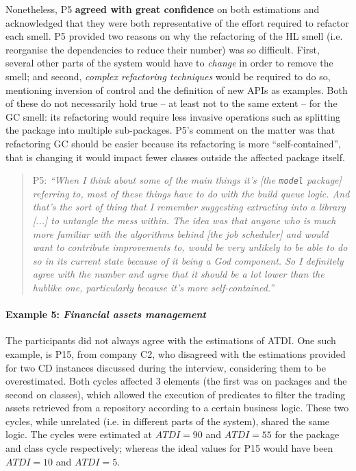 Nonetheless, P5 \textbf{agreed with great confidence} on both estimations and acknowledged that they were both representative of the effort required to refactor each smell.
P5 provided two reasons on why the refactoring of the HL smell (i.e. reorganise the dependencies to reduce their number) was so difficult.
First, several other parts of the system would have to \emph{change} in order to remove the smell;
and second, \emph{complex refactoring techniques} would be required to do so, mentioning inversion of control and the definition of new APIs as examples.
Both of these do not necessarily hold true -- at least not to the same extent -- for the GC smell: its refactoring would require less invasive operations such as splitting the package into multiple sub-packages.
P5's comment on the matter was that refactoring GC should be easier because its refactoring is more ``self-contained'', that is changing it would impact fewer classes outside the affected package itself.

\begin{quote}
    P5: \emph{``When I think about some of the main things it's [the \texttt{model} package] referring to, most of these things have to do with the build queue logic. And that's the sort of thing that I remember suggesting extracting into a library [...] to untangle the mess within. The idea was that anyone who is much more familiar with the algorithms behind [the job scheduler] and would want to contribute improvements to, would be very unlikely to be able to do so in its current state because of it being a God component. 
    So I definitely agree with the number and agree that it should be a lot lower than the hublike one, particularly because it's more self-contained.''}
\end{quote}

\paragraph{Example 5: \emph{Financial assets management}}
The participants did not always agree with the estimations of ATDI. One such example, is P15, from company C2, who disagreed with the estimations provided for two CD instances discussed during the interview, considering them to be overestimated.
Both cycles affected 3 elements (the first was on packages and the second on classes), which allowed the execution of predicates to filter the trading assets retrieved from a repository according to a certain business logic. 
These two cycles, while unrelated (i.e. in different parts of the system), shared the same logic.
The cycles were estimated at $ATDI = 90$ and $ATDI = 55$ for the package and class cycle respectively; whereas the ideal values for P15 would have been $ATDI = 10$ and $ATDI = 5$.

